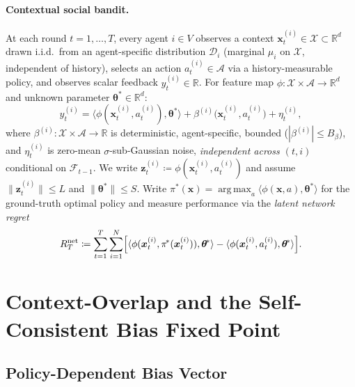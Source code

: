 \documentclass[11pt]{article}
\DeclareMathOperator*{\argmax}{arg\,max}
\begin{document}
\paragraph{Contextual social bandit.}
At each round $t=1,\dots,T$, every agent $i\in V$ observes a context
$\bm{x}_t^{(i)}\in\mathcal{X}\subset\mathbb{R}^d$ drawn i.i.d.\ from
an agent-specific distribution $\mathcal{D}_i$ (marginal $\mu_i$ on
$\mathcal{X}$, independent of history), selects an action
$a_t^{(i)}\in\mathcal{A}$ via a history-measurable policy, and
observes scalar feedback $y_t^{(i)}\in\mathbb{R}$.  For feature map
$\phi:\mathcal{X}\times\mathcal{A}\to\mathbb{R}^d$ and unknown
parameter $\bm{\theta}^{\!*}\in\mathbb{R}^d$:
\begin{equation}
y_t^{(i)}=\langle\phi(\bm{x}_t^{(i)},a_t^{(i)}),\bm{\theta}^{\!*}\rangle
+\beta^{(i)}\!\bigl(\bm{x}_t^{(i)},a_t^{(i)}\bigr)+\eta_t^{(i)},
\label{eq:observation_model}
\end{equation}
where $\beta^{(i)}:\mathcal{X}\times\mathcal{A}\to\mathbb{R}$ is
deterministic, agent-specific, bounded ($|\beta^{(i)}|\leq B_\beta$),
and $\eta_t^{(i)}$ is zero-mean $\sigma$-sub-Gaussian noise,
\emph{independent across $(t,i)$} conditional on
$\mathcal{F}_{t-1}$.  We write
$\bm{z}_t^{(i)}\coloneqq\phi(\bm{x}_t^{(i)},a_t^{(i)})$ and assume
$\|\bm{z}_t^{(i)}\|\leq L$ and $\|\bm{\theta}^{\!*}\|\leq S$.
Write $\pi^{\!*}(\bm{x})=\argmax_a\langle\phi(\bm{x},a),\bm{\theta}^{\!*}\rangle$
for the ground-truth optimal policy and measure performance via the
\emph{latent network regret}
\begin{equation}
R_T^{\mathrm{net}}\coloneqq\sum_{t=1}^T\sum_{i=1}^N
\Bigl[\langle\phi(\bm{x}_t^{(i)},\pi^{\!*}(\bm{x}_t^{(i)})),\bm{\theta}^{\!*}\rangle
-\langle\phi(\bm{x}_t^{(i)},a_t^{(i)}),\bm{\theta}^{\!*}\rangle\Bigr].
\label{eq:latent_regret}
\end{equation}

\section{Context-Overlap and the Self-Consistent Bias Fixed Point}
\label{sec:overlap}

\subsection{Policy-Dependent Bias Vector}
\end{document}
